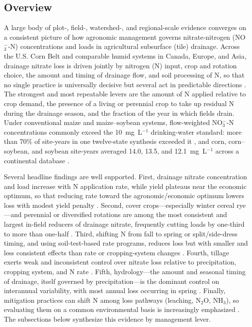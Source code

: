 \subsection{Overview}

A large body of plot-, field-, watershed-, and regional-scale evidence converges on a consistent picture of how agronomic management governs nitrate-nitrogen (NO$_3^-$-N) concentrations and loads in agricultural subsurface (tile) drainage. Across the U.S. Corn Belt and comparable humid systems in Canada, Europe, and Asia, drainage nitrate loss is driven jointly by nitrogen (N) input, crop and rotation choice, the amount and timing of drainage flow, and soil processing of N, so that no single practice is universally decisive but several act in predictable directions \parencite{Dinnes2002}. The strongest and most repeatable levers are the amount of N applied relative to crop demand, the presence of a living or perennial crop to take up residual N during the drainage season, and the fraction of the year in which fields drain. Under conventional maize and maize--soybean systems, flow-weighted NO$_3^-$-N concentrations commonly exceed the 10~mg~L$^{-1}$ drinking-water standard: more than 70\% of site-years in one twelve-state synthesis exceeded it \parencite{Liu2021}, and corn, corn--soybean, and soybean site-years averaged 14.0, 13.5, and 12.1~mg~L$^{-1}$ across a continental database \parencite{Hertzberger2019}.

Several headline findings are well supported. First, drainage nitrate concentration and load increase with N application rate, while yield plateaus near the economic optimum, so that reducing rate toward the agronomic/economic optimum lowers loss with modest yield penalty \parencite{Jaynes2001,Helmers2012b,Zhao2016,Hertzberger2019}. Second, cover crops---especially winter cereal rye---and perennial or diversified rotations are among the most consistent and largest in-field reducers of drainage nitrate, frequently cutting loads by one-third to more than one-half \parencite{Ruffatti2019,OBrien2022,PrezaFontes2021,Daigh2015b,Gentry2025}. Third, shifting N from fall to spring or split/side-dress timing, and using soil-test-based rate programs, reduces loss but with smaller and less consistent effects than rate or cropping-system changes \parencite{Randall2003,Dinnes2002,Jaynes2004}. Fourth, tillage exerts weak and inconsistent control over nitrate loss relative to precipitation, cropping system, and N rate \parencite{RANDALL1995,Weed1996,Randall2001}. Fifth, hydrology---the amount and seasonal timing of drainage, itself governed by precipitation---is the dominant control on interannual variability, with most annual loss occurring in spring \parencite{Randall2003,Bakhsh2010,RANDALL1995}. Finally, mitigation practices can shift N among loss pathways (leaching, N$_2$O, NH$_3$), so evaluating them on a common environmental basis is increasingly emphasized \parencite{PrezaFontes2023,Menegaz2025}. The subsections below synthesize this evidence by management lever.

